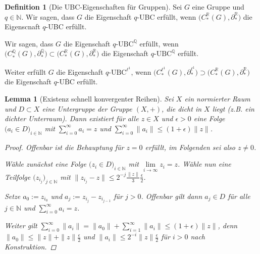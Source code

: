 \documentclass[a4paper,twoside,10pt]{scrreprt}
\newcommand{\N}{\mathbb{N}}
\newcommand{\Q}{\mathbb{Q}}
\newcommand{\R}{\mathbb{R}}
\newtheorem{lemma}[satz]{Lemma}
\theoremstyle{definition}
\newtheorem{definition}[satz]{Definition}
\begin{document}
\begin{definition}[Die UBC-Eigenschaften für Gruppen]\label{def:UBCforGroups}
Sei $G$ eine Gruppe und $q\in\N$. Wir sagen, dass $G$ die Eigenschaft $q$-UBC erfüllt, wenn $\bigl(C_*^{\R}(G),\partial_*^{\R}\bigr)$ die Eigenscnaft $q$-UBC erfüllt.\par
Wir sagen, dass $G$ die Eigenschaft $q$-$\text{UBC}^{\Q}$ erfüllt, wenn $\bigl(C_*^{\Q}(G),\partial_*^{\Q}\bigr)\subset \bigl(C_*^{\R}(G),\partial_*^{\R}\bigr)$ die Eigenschaft $q$-$\text{UBC}^{\Q}$ erfüllt.\par
Weiter erfüllt $G$ die Eigenschaft $q$-$\text{UBC}^{\ell^1}$, wenn $\bigl(C_*^{\ell^1}(G),\partial_*^{\ell^1}\bigr)\supset \bigl(C_*^{\R}(G),\partial_*^{\R}\bigr)$ die Eigenschaft $q$-$\overline{\text{UBC}}$ erfüllt.
\end{definition}

\begin{lemma}[Existenz schnell konvergenter Reihen]\label{lem:FastConvergingSeries}
Sei $X$ ein normierter Raum und $D\subset X$ eine Untergruppe der Gruppe $(X,+)$, die dicht in $X$ liegt (z.B. ein dichter Unterraum). Dann existiert für alle $z\in X$ und $\epsilon>0$ eine Folge $\bigl(a_i\in D\bigr)_{i\in\N}$ mit $\sum\limits_{i=0}^{\infty}a_i=z$ und $\sum\limits_{i=0}^{\infty}\|a_i\|\leq(1+\epsilon)\|z\|$.
\begin{proof}
Offenbar ist die Behauptung für $z=0$ erfüllt, im Folgenden sei also $z\neq 0$.\par
Wähle zunächst eine Folge $\bigl(z_i\in D\bigr)_{i\in\N}$ mit $\lim\limits_{i\to\infty}z_i=z$. Wähle nun eine Teilfolge $\bigl(z_{i_j}\bigr)_{j\in\N}$ mit $\|z_{i_j}-z\|\leq 2^{-j}\frac{\|z\|}{3}\frac{\epsilon}{2}$.\par
Setze $a_0:=z_{i_0}$ und $a_j:=z_{i_j}-z_{i_{j-1}}$ für $j>0$. Offenbar gilt dann $a_j\in D$ für alle $j\in \N$ und $\sum\limits_{i=0}^{\infty}a_i=z$.\par
Weiter gilt $\sum\limits_{i=0}^{\infty}\|a_i\|=\|a_0\|+\sum\limits_{i=1}^{\infty}\|a_i\|\leq (1+\epsilon)\|z\|$, denn $\|a_0\|\leq \|z\|+\|z\|\frac{\epsilon}{2}$ und $\|a_i\|\leq 2^{-i}\|z\|\frac{\epsilon}{2}$ für $i>0$ nach Konstruktion.
\end{proof}
\end{lemma}
\end{document}
